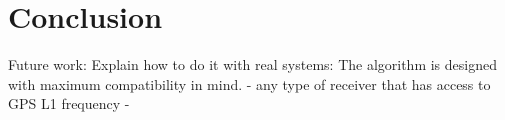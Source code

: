 
\def\chapdir{./ChapterConclusion}
\chapter{Conclusion}\label{ch:conclusion}

Future work:
Explain how to do it with real systems:
The algorithm is designed with maximum compatibility in mind. 
- any type of receiver that has access to GPS L1 frequency
-



